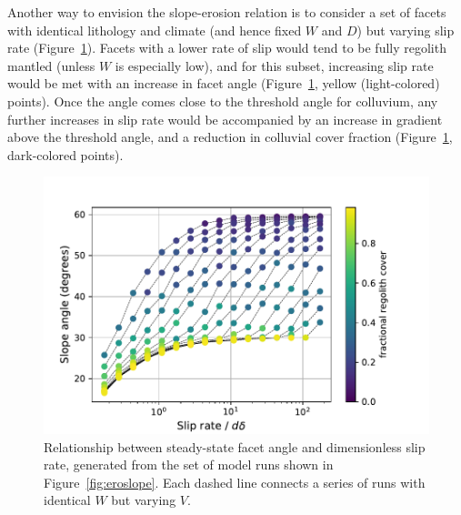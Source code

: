 Another way to envision the slope-erosion relation is to consider a set of facets with identical lithology and climate (and hence fixed $W$ and $D$) but varying slip rate (Figure~\ref{fig:slopeslip}). Facets with a lower rate of slip would tend to be fully regolith mantled (unless $W$ is especially low), and for this subset, increasing slip rate would be met with an increase in facet angle (Figure~\ref{fig:slopeslip}, yellow (light-colored) points). Once the angle comes close to the threshold angle for colluvium, any further increases in slip rate would be accompanied by an increase in gradient above the threshold angle, and a reduction in colluvial cover fraction (Figure~\ref{fig:slopeslip}, dark-colored points).

\begin{figure}[ht!]
\centerline{\includegraphics{Figures/slope_angle_vs_slip_rate_by_frac_soil.pdf}}
\caption{Relationship between steady-state facet angle and dimensionless slip rate, generated from the set of model runs shown in Figure~\ref{fig:eroslope}. Each dashed line connects a series of runs with identical $W$ but varying $V$.}
\label{fig:slopeslip}
\end{figure}

